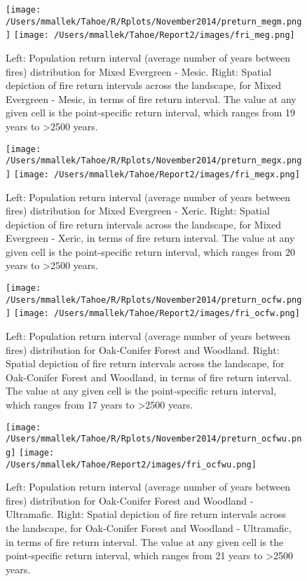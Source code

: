 \begin{figure}[ht]
\texttt{[image: /Users/mmallek/Tahoe/R/Rplots/November2014/preturn\_megm.png]}
\texttt{[image: /Users/mmallek/Tahoe/Report2/images/fri\_meg.png]}
\caption{Left: Population return interval (average number of years between fires) distribution for Mixed Evergreen - Mesic.  Right: Spatial depiction of fire return intervals across the landscape, for Mixed Evergreen - Mesic, in terms of fire return interval. The value at any given cell is the point-specific return interval, which ranges from 19 years to \textgreater 2500 years.}
\label{preturn_megm}
\end{figure}

\begin{figure}[p]
\texttt{[image: /Users/mmallek/Tahoe/R/Rplots/November2014/preturn\_megx.png]}
\texttt{[image: /Users/mmallek/Tahoe/Report2/images/fri\_megx.png]}
\caption{Left: Population return interval (average number of years between fires) distribution for Mixed Evergreen - Xeric.  Right: Spatial depiction of fire return intervals across the landscape, for Mixed Evergreen - Xeric, in terms of fire return interval. The value at any given cell is the point-specific return interval, which ranges from 20 years to \textgreater 2500 years.}
\label{preturn_megx}
\end{figure}

\begin{figure}[p]
\texttt{[image: /Users/mmallek/Tahoe/R/Rplots/November2014/preturn\_ocfw.png]}
\texttt{[image: /Users/mmallek/Tahoe/Report2/images/fri\_ocfw.png]}
\caption{Left: Population return interval (average number of years between fires) distribution for Oak-Conifer Forest and Woodland.  Right: Spatial depiction of fire return intervals across the landscape, for Oak-Conifer Forest and Woodland, in terms of fire return interval. The value at any given cell is the point-specific return interval, which ranges from 17 years to \textgreater 2500 years.}
\label{preturn_ocfw}
\end{figure}

\begin{figure}[p]
\texttt{[image: /Users/mmallek/Tahoe/R/Rplots/November2014/preturn\_ocfwu.png]}
\texttt{[image: /Users/mmallek/Tahoe/Report2/images/fri\_ocfwu.png]}
\caption{Left: Population return interval (average number of years between fires) distribution for Oak-Conifer Forest and Woodland - Ultramafic.  Right: Spatial depiction of fire return intervals across the landscape, for Oak-Conifer Forest and Woodland - Ultramafic, in terms of fire return interval. The value at any given cell is the point-specific return interval, which ranges from 21 years to \textgreater 2500 years.}
\label{preturn_ocfwu}
\end{figure}

